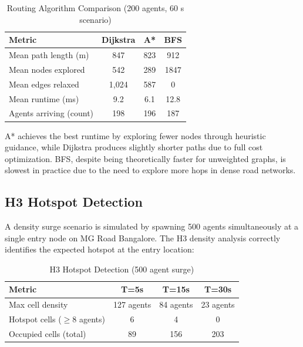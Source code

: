 \documentclass[conference]{IEEEtran}
\begin{document}
\begin{table}[ht]
\centering
\caption{Routing Algorithm Comparison (200 agents, 60 s scenario)}
\label{tab:algorithms}
\renewcommand{\arraystretch}{1.15}
\begin{tabular}{|l|c|c|c|}
\hline
\textbf{Metric} & \textbf{Dijkstra} & \textbf{A*} & \textbf{BFS} \\
\hline
Mean path length (m) & 847 & 823 & 912 \\
\hline
Mean nodes explored & 542 & 289 & 1847 \\
\hline
Mean edges relaxed & 1,024 & 587 & 0 \\
\hline
Mean runtime (ms) & 9.2 & 6.1 & 12.8 \\
\hline
Agents arriving (count) & 198 & 196 & 187 \\
\hline
\end{tabular}
\end{table}

A* achieves the best runtime by exploring fewer nodes through heuristic guidance, while Dijkstra produces slightly shorter paths due to full cost optimization. BFS, despite being theoretically faster for unweighted graphs, is slowest in practice due to the need to explore more hops in dense road networks.

\subsection{H3 Hotspot Detection}

A density surge scenario is simulated by spawning 500 agents simultaneously at a single entry node on MG Road Bangalore. The H3 density analysis correctly identifies the expected hotspot at the entry location:

\begin{table}[ht]
\centering
\caption{H3 Hotspot Detection (500 agent surge)}
\label{tab:hotspots}
\renewcommand{\arraystretch}{1.15}
\begin{tabular}{|l|c|c|c|}
\hline
\textbf{Metric} & \textbf{T=5s} & \textbf{T=15s} & \textbf{T=30s} \\
\hline
Max cell density & 127 agents & 84 agents & 23 agents \\
\hline
Hotspot cells ($\geq 8$ agents) & 6 & 4 & 0 \\
\hline
Occupied cells (total) & 89 & 156 & 203 \\
\hline
\end{tabular}
\end{table}
\end{document}
